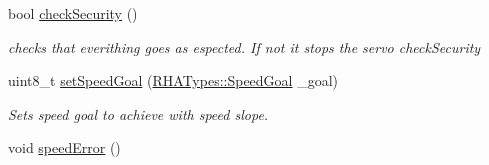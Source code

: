 \begin{DoxyCompactItemize}
bool \hyperlink{classServoRHA_ac44b27d1ebc80a20d02be44c9b9fe522}{check\+Security} ()
\begin{DoxyCompactList}\small\item\em checks that everithing goes as espected. If not it stops the servo  check\+Security \end{DoxyCompactList}\item 
uint8\+\_\+t \hyperlink{classServoRHA_a90c067d9d37dba8d85aad7faacf5ac7d}{set\+Speed\+Goal} (\hyperlink{structRHATypes_1_1SpeedGoal}{R\+H\+A\+Types\+::\+Speed\+Goal} \+\_\+goal)
\begin{DoxyCompactList}\small\item\em Sets speed goal to achieve with speed slope. \end{DoxyCompactList}\item 
void \hyperlink{classServoRHA_a51a002767a91a7e4c2a8edc9ce8ab0df}{speed\+Error} ()\hypertarget{classServoRHA_a51a002767a91a7e4c2a8edc9ce8ab0df}{}\label{classServoRHA_a51a002767a91a7e4c2a8edc9ce8ab0df}


\end{DoxyCompactItemize}
